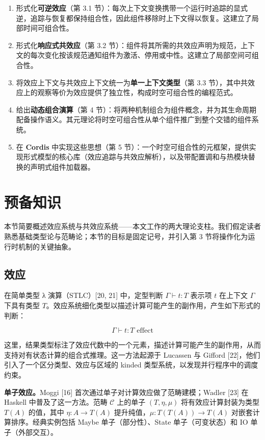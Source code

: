 \documentclass[11pt,a4paper]{article}
\theoremstyle{plain}
\theoremstyle{definition}
\theoremstyle{remark}
\begin{document}
\begin{enumerate}
\item 形式化\textbf{可逆效应}（第 3.1 节）：每次上下文变换携带一个运行时追踪的显式逆，追踪与恢复都保持组合性，因此组件移除时上下文得以恢复。这建立了局部时间可组合性。
\item 形式化\textbf{响应式共效应}（第 3.2 节）：组件将其所需的共效应声明为规范，上下文的每次变化按该规范通知组件为激活、停用或中性。这建立了局部空间可组合性。
\item 将效应上下文与共效应上下文统一为\textbf{单一上下文类型}（第 3.3 节），其中共效应上的观察等价为效应提供了独立性，构成时空可组合性的编程范式。
\item 给出\textbf{动态组合演算}（第 4 节）：将两种机制组合为组件概念，并为其生命周期配备操作语义。其元理论将时空可组合性从单个组件推广到整个交错的组件系统。
\item 在 \textbf{Cordis} 中实现这些思想（第 5 节）：一个时空可组合性的元框架，提供实现形式模型的核心库（效应追踪与共效应解析），以及带配置调和与热模块替换的声明式组件加载器。
\end{enumerate}
\section{预备知识}

本节简要概述效应系统与共效应系统——本文工作的两大理论支柱。我们假定读者熟悉基础类型论与范畴论；本节的目标是固定记号，并引入第 3 节将操作化为运行时机制的关键抽象。

\subsection{效应}

在简单类型 λ 演算（STLC）[20, 21] 中，定型判断 $\Gamma \vdash t : T$ 表示项 $t$ 在上下文 $\Gamma$ 下具有类型 $T$。效应系统细化类型以描述计算可能产生的副作用，产生如下形式的判断：

\[
\Gamma \vdash t : T \text{ effect} \tag{1}
\]

这里，结果类型标注了效应代数中的一个元素，描述计算可能产生的副作用，从而支持对有状态计算的组合式推理。这一方法起源于 Lucassen 与 Gifford [22]，他们引入了一个区分类型、效应与区域的 kinded 类型系统，以发现并行程序中的调度约束。

\textbf{单子效应。}Moggi [16] 首次通过单子对计算效应做了范畴建模；Wadler [23] 在 Haskell 中普及了这一方法。范畴 $\mathcal{C}$ 上的单子 $(T, \eta, \mu)$ 将有效应计算封装为类型 $T(A)$ 的值，其中 $\eta : A \to T(A)$ 提升纯值，$\mu : T(T(A)) \to T(A)$ 对嵌套计算排序。经典实例包括 Maybe 单子（部分性）、State 单子（可变状态）和 IO 单子（外部交互）。
\end{document}
